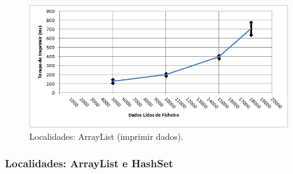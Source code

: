 \documentclass[a5paper,twocolumn, 11pt]{article}
\begin{document}
\begin{figure}[h!b!t!]
    \caption[Localidades: ArrayList (imprimir dados)]{Localidades: ArrayList (imprimir dados).}
    \label{hashtable}
    \centering
        \includegraphics[width=400pt]{cloc_conf1_o5.png}
\end{figure}

\newpage
\twocolumn
\subsubsection[Localidades:\\ArrayList e HashSet]{Localidades: \vbox{ArrayList e HashSet}}
\end{document}
